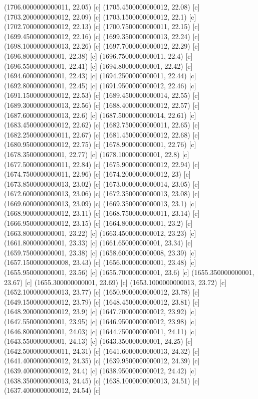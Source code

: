 {{{(1706.0000000000011, 22.05) [c] 
(1705.4500000000012, 22.08) [c] 
(1703.2000000000012, 22.09) [c] 
(1703.1500000000012, 22.1) [c] 
(1702.7000000000012, 22.13) [c] 
(1700.7500000000011, 22.15) [c] 
(1699.4500000000012, 22.16) [c] 
(1699.3500000000013, 22.24) [c] 
(1698.1000000000013, 22.26) [c] 
(1697.7000000000012, 22.29) [c] 
(1696.800000000001, 22.38) [c] 
(1696.7500000000011, 22.4) [c] 
(1696.550000000001, 22.41) [c] 
(1694.800000000001, 22.42) [c] 
(1694.600000000001, 22.43) [c] 
(1694.2500000000011, 22.44) [c] 
(1692.800000000001, 22.45) [c] 
(1691.9500000000012, 22.46) [c] 
(1691.1500000000012, 22.53) [c] 
(1689.4500000000014, 22.55) [c] 
(1689.3000000000013, 22.56) [c] 
(1688.4000000000012, 22.57) [c] 
(1687.6000000000013, 22.6) [c] 
(1687.5000000000014, 22.61) [c] 
(1683.4500000000012, 22.62) [c] 
(1682.7500000000011, 22.65) [c] 
(1682.2500000000011, 22.67) [c] 
(1681.4500000000012, 22.68) [c] 
(1680.9500000000012, 22.75) [c] 
(1678.900000000001, 22.76) [c] 
(1678.350000000001, 22.77) [c] 
(1678.100000000001, 22.8) [c] 
(1677.5000000000011, 22.84) [c] 
(1675.9000000000012, 22.94) [c] 
(1674.7500000000011, 22.96) [c] 
(1674.2000000000012, 23) [c] 
(1673.8500000000013, 23.02) [c] 
(1673.0000000000014, 23.05) [c] 
(1672.6000000000013, 23.06) [c] 
(1672.3500000000013, 23.08) [c] 
(1669.6000000000013, 23.09) [c] 
(1669.3500000000013, 23.1) [c] 
(1668.9000000000012, 23.11) [c] 
(1668.7500000000011, 23.14) [c] 
(1666.9500000000012, 23.15) [c] 
(1664.800000000001, 23.2) [c] 
(1663.800000000001, 23.22) [c] 
(1663.4500000000012, 23.23) [c] 
(1661.800000000001, 23.33) [c] 
(1661.650000000001, 23.34) [c] 
(1659.750000000001, 23.38) [c] 
(1658.6000000000008, 23.39) [c] 
(1657.1500000000008, 23.43) [c] 
(1656.000000000001, 23.48) [c] 
(1655.950000000001, 23.56) [c] 
(1655.700000000001, 23.6) [c] 
(1655.350000000001, 23.67) [c] 
(1655.300000000001, 23.69) [c] 
(1653.1000000000013, 23.72) [c] 
(1652.1000000000013, 23.77) [c] 
(1650.9000000000012, 23.78) [c] 
(1649.1500000000012, 23.79) [c] 
(1648.4500000000012, 23.81) [c] 
(1648.2000000000012, 23.9) [c] 
(1647.7000000000012, 23.92) [c] 
(1647.550000000001, 23.95) [c] 
(1646.9500000000012, 23.98) [c] 
(1646.800000000001, 24.03) [c] 
(1644.7500000000011, 24.11) [c] 
(1643.550000000001, 24.13) [c] 
(1643.350000000001, 24.25) [c] 
(1642.5000000000011, 24.31) [c] 
(1641.6000000000013, 24.32) [c] 
(1641.4000000000012, 24.35) [c] 
(1639.9500000000012, 24.39) [c] 
(1639.4000000000012, 24.4) [c] 
(1638.9500000000012, 24.42) [c] 
(1638.3500000000013, 24.45) [c] 
(1638.1000000000013, 24.51) [c] 
(1637.4000000000012, 24.54) [c] 
}}}
